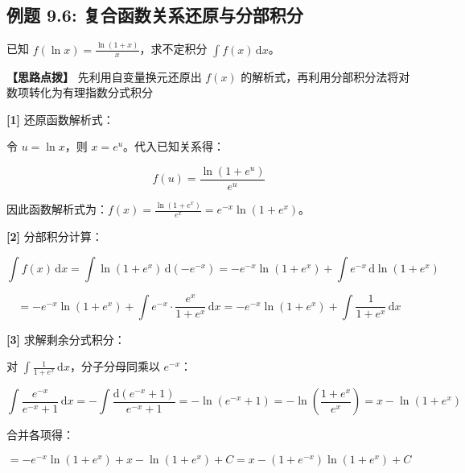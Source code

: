 \documentclass[11pt,a4paper,UTF8]{ctexart}
\begin{document}
\subsection{例题 9.6: 复合函数关系还原与分部积分}

已知 $f(\ln x) = \frac{\ln(1+x)}{x}$，求不定积分 $\int f(x)\,\mathrm{d}x$。

\textbf{\color{DeepPurple}【思路点拨】} 先利用自变量换元还原出 $f(x)$ 的解析式，再利用分部积分法将对数项转化为有理指数分式积分


\begin{solbox}[分步推导与答题规范]
\textbf{[1]} 还原函数解析式：

令 $u = \ln x$，则 $x = e^u$。代入已知关系得：


\begin{equation*}
f(u) = \frac{\ln(1+e^u)}{e^u}
\end{equation*}


因此函数解析式为：$f(x) = \frac{\ln(1+e^x)}{e^x} = e^{-x}\ln(1+e^x)$。

\textbf{[2]} 分部积分计算：


\begin{equation*}
\int f(x)\,\mathrm{d}x = \int \ln(1+e^x)\,\mathrm{d}(-e^{-x}) = -e^{-x}\ln(1+e^x) + \int e^{-x}\,\mathrm{d}\ln(1+e^x)
\end{equation*}



\begin{equation*}
= -e^{-x}\ln(1+e^x) + \int e^{-x} \cdot \frac{e^x}{1+e^x}\,\mathrm{d}x = -e^{-x}\ln(1+e^x) + \int \frac{1}{1+e^x}\,\mathrm{d}x
\end{equation*}


\textbf{[3]} 求解剩余分式积分：

对 $\int \frac{1}{1+e^x}\,\mathrm{d}x$，分子分母同乘以 $e^{-x}$：


\begin{equation*}
\int \frac{e^{-x}}{e^{-x}+1}\,\mathrm{d}x = -\int \frac{\mathrm{d}(e^{-x}+1)}{e^{-x}+1} = -\ln(e^{-x}+1) = -\ln\left(\frac{1+e^x}{e^x}\right) = x - \ln(1+e^x)
\end{equation*}


合并各项得：


\begin{equation*}
= -e^{-x}\ln(1+e^x) + x - \ln(1+e^x) + C = x - (1+e^{-x})\ln(1+e^x) + C
\end{equation*}

\end{solbox}
\end{document}

